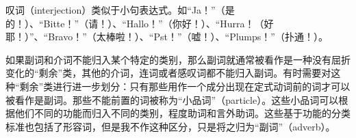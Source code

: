 叹词（interjection）类似于小句表达式。如“Ja！”（是的！）、“Bitte！”（请！）、“Hal\-lo！”（你好！）、“Hurra！（好耶！）”、“Bravo！”（太棒啦！）、“Pst！”（嘘！）、“Plumps！”（扑通！）。
 
如果副词和介词不能归入某个特定的类别，那么副词就通常被看作是一种没有屈折变化的“剩余”类，其他的介词，连词或者感叹词都不能归入副词。有时需要对这种“剩余”类进行进一步划分：只有那些用作一个成分出现在定式动词前的词才可以被看作是副词。那些不能前置的词被称为“小品词”（particle）。这些小品词可以根据他们不同的功能而归入不同的类别，\egc 程度助词和言外助词。这些基于功能的分类标准也包括了形容词，但是我不作这种区分，只是将之归为“副词”（adverb）。

